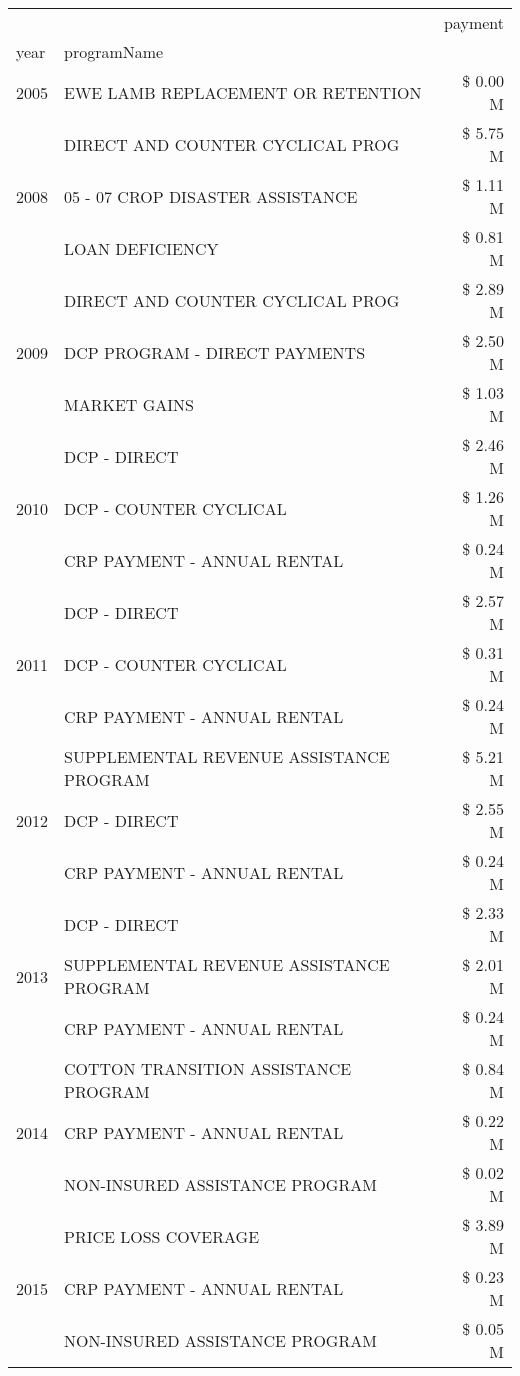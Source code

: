 \begin{tabular}{llr}
\toprule
 &  & payment \\
year & programName &  \\
\midrule
2005 & EWE LAMB REPLACEMENT OR RETENTION & \$ 0.00 M \\
\cline{1-3}
\multirow[t]{3}{*}{2008} & DIRECT AND COUNTER CYCLICAL PROG & \$ 5.75 M \\
 & 05 - 07 CROP DISASTER ASSISTANCE & \$ 1.11 M \\
 & LOAN DEFICIENCY & \$ 0.81 M \\
\cline{1-3}
\multirow[t]{3}{*}{2009} & DIRECT AND COUNTER CYCLICAL PROG & \$ 2.89 M \\
 & DCP PROGRAM - DIRECT PAYMENTS & \$ 2.50 M \\
 & MARKET GAINS & \$ 1.03 M \\
\cline{1-3}
\multirow[t]{3}{*}{2010} & DCP - DIRECT & \$ 2.46 M \\
 & DCP - COUNTER CYCLICAL & \$ 1.26 M \\
 & CRP PAYMENT - ANNUAL RENTAL & \$ 0.24 M \\
\cline{1-3}
\multirow[t]{3}{*}{2011} & DCP - DIRECT & \$ 2.57 M \\
 & DCP - COUNTER CYCLICAL & \$ 0.31 M \\
 & CRP PAYMENT - ANNUAL RENTAL & \$ 0.24 M \\
\cline{1-3}
\multirow[t]{3}{*}{2012} & SUPPLEMENTAL REVENUE ASSISTANCE PROGRAM & \$ 5.21 M \\
 & DCP - DIRECT & \$ 2.55 M \\
 & CRP PAYMENT - ANNUAL RENTAL & \$ 0.24 M \\
\cline{1-3}
\multirow[t]{3}{*}{2013} & DCP - DIRECT & \$ 2.33 M \\
 & SUPPLEMENTAL REVENUE ASSISTANCE PROGRAM & \$ 2.01 M \\
 & CRP PAYMENT - ANNUAL RENTAL & \$ 0.24 M \\
\cline{1-3}
\multirow[t]{3}{*}{2014} & COTTON TRANSITION ASSISTANCE PROGRAM & \$ 0.84 M \\
 & CRP PAYMENT - ANNUAL RENTAL & \$ 0.22 M \\
 & NON-INSURED ASSISTANCE PROGRAM & \$ 0.02 M \\
\cline{1-3}
\multirow[t]{3}{*}{2015} & PRICE LOSS COVERAGE & \$ 3.89 M \\
 & CRP PAYMENT - ANNUAL RENTAL & \$ 0.23 M \\
 & NON-INSURED ASSISTANCE PROGRAM & \$ 0.05 M \\

\end{tabular}
